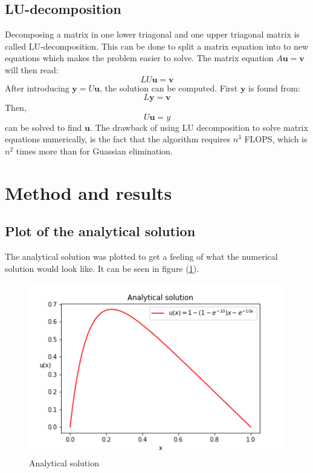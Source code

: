 \documentclass[12pt]{article}
\begin{document}
\subsection{LU-decomposition}
Decomposing a matrix in one lower triagonal and one upper triagonal matrix is called LU-decomposition. This can be done to split a matrix equation into to new equations which makes the problem easier to solve. 
The matrix equation $A\mathbf{u}=\mathbf{v}$ will then read:
\begin{equation}
LU\mathbf{u}=\mathbf{v}
\end{equation}
After introducing $\mathbf{y}=U\mathbf{u}$, the solution can be computed. First $\mathbf{y}$ is found from:
\begin{equation}
L\mathbf{y}=\mathbf{v}
\end{equation}
Then, \begin{equation}
U\mathbf{u}=y
\end{equation}
can be solved to find $\mathbf{u}$. 
	The drawback of using LU decomposition to solve matrix equations numerically, is the fact that the algorithm requires $n^{3}$ FLOPS, which is $n^{2}$ times more than for Guassian elimination. 
\section{Method and results}
\subsection{Plot of the analytical solution}
The analytical solution was plotted to get a feeling of what the numerical solution would look like. It can be seen in figure (\ref{fig:analytical}).

\begin{figure}
\caption{Analytical solution}
\label{fig:analytical}
\includegraphics[]{analytical.png}
\end{figure}
\end{document}
